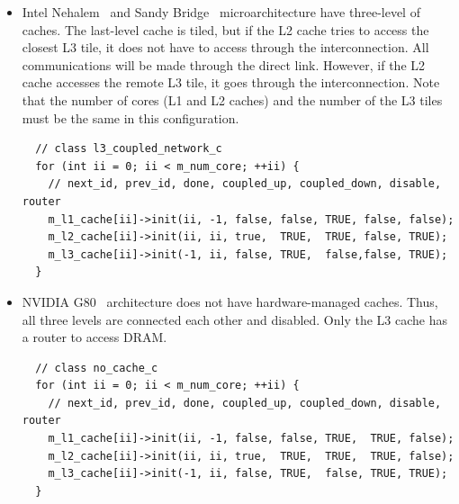 \begin{itemize}

  \item Intel Nehalem~\cite{nehalem} and Sandy
  Bridge~\cite{sandybridge} microarchitecture have three-level of
  caches. The last-level cache is tiled, but if the L2 cache tries to
  access the closest L3 tile, it does not have to access through the
  interconnection. All communications will be made through the direct
  link. However, if the L2 cache accesses the remote L3 tile, it goes
  through the interconnection. Note that the number of cores (L1 and
  L2 caches) and the number of the L3 tiles must be the same in this
  configuration.

  \smallskip
  \begin{lstlisting}
  // class l3_coupled_network_c
  for (int ii = 0; ii < m_num_core; ++ii) {
    // next_id, prev_id, done, coupled_up, coupled_down, disable, router
    m_l1_cache[ii]->init(ii, -1, false, false, TRUE, false, false);
    m_l2_cache[ii]->init(ii, ii, true,  TRUE,  TRUE, false, TRUE);
    m_l3_cache[ii]->init(-1, ii, false, TRUE,  false,false, TRUE);
  }

  \end{lstlisting}
  \smallskip

  \item NVIDIA G80~\cite{g80} architecture does not have
  hardware-managed caches. Thus, all three levels are connected each
  other and disabled. Only the L3 cache has a router to access DRAM.

  \smallskip
  \begin{lstlisting}
  // class no_cache_c
  for (int ii = 0; ii < m_num_core; ++ii) {
    // next_id, prev_id, done, coupled_up, coupled_down, disable, router
    m_l1_cache[ii]->init(ii, -1, false, false, TRUE,  TRUE, false);
    m_l2_cache[ii]->init(ii, ii, true,  TRUE,  TRUE,  TRUE, false);
    m_l3_cache[ii]->init(-1, ii, false, TRUE,  false, TRUE, TRUE);
  }


\end{lstlisting}
\end{itemize}
